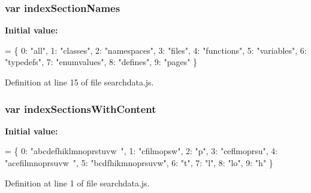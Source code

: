 \subsubsection[{index\+Section\+Names}]{\setlength{\rightskip}{0pt plus 5cm}var index\+Section\+Names}\label{a00102_a77149ceed055c6c6ce40973b5bdc19ad}
{\bfseries Initial value\+:}
\begin{DoxyCode}
=
\{
  0: \textcolor{stringliteral}{"all"},
  1: \textcolor{stringliteral}{"classes"},
  2: \textcolor{stringliteral}{"namespaces"},
  3: \textcolor{stringliteral}{"files"},
  4: \textcolor{stringliteral}{"functions"},
  5: \textcolor{stringliteral}{"variables"},
  6: \textcolor{stringliteral}{"typedefs"},
  7: \textcolor{stringliteral}{"enumvalues"},
  8: \textcolor{stringliteral}{"defines"},
  9: \textcolor{stringliteral}{"pages"}
\}
\end{DoxyCode}


Definition at line 15 of file searchdata.\+js.

\hypertarget{a00102_a6250af3c9b54dee6efc5f55f40c78126}{}
\subsubsection[{index\+Sections\+With\+Content}]{\setlength{\rightskip}{0pt plus 5cm}var index\+Sections\+With\+Content}\label{a00102_a6250af3c9b54dee6efc5f55f40c78126}
{\bfseries Initial value\+:}
\begin{DoxyCode}
=
\{
  0: \textcolor{stringliteral}{"abcdefhiklmnoprstuvw~"},
  1: \textcolor{stringliteral}{"cfilmopsw"},
  2: \textcolor{stringliteral}{"p"},
  3: \textcolor{stringliteral}{"ceflmoprsu"},
  4: \textcolor{stringliteral}{"acefilmnoprsuvw~"},
  5: \textcolor{stringliteral}{"bcdfhikmnoprsuvw"},
  6: \textcolor{stringliteral}{"t"},
  7: \textcolor{stringliteral}{"l"},
  8: \textcolor{stringliteral}{"lo"},
  9: \textcolor{stringliteral}{"h"}
\}
\end{DoxyCode}


Definition at line 1 of file searchdata.\+js.

